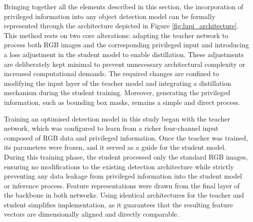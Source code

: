 Bringing together all the elements described in this section, the incorporation of privileged information into any object detection model can be formally represented through the architecture depicted in Figure \ref{fig:lupi_architecture}. This method rests on two core alterations: adapting the teacher network to process both RGB images and the corresponding privileged input and introducing a loss adjustment in the student model to enable distillation. These adjustments are deliberately kept minimal to prevent unnecessary architectural complexity or increased computational demands. The required changes are confined to modifying the input layer of the teacher model and integrating a distillation mechanism during the student training. Moreover, generating the privileged information, such as bounding box masks, remains a simple and direct process.

Training an optimised detection model in this study began with the teacher network, which was configured to learn from a richer four-channel input composed of RGB data and privileged information. Once the teacher was trained, its parameters were frozen, and it served as a guide for the student model. During this training phase, the student processed only the standard RGB images, ensuring no modifications to the existing detection architecture while strictly preventing any data leakage from privileged information into the student model or inference process. Feature representations were drawn from the final layer of the backbone in both networks. Using identical architectures for the teacher and student simplifies implementation, as it guarantees that the resulting feature vectors are dimensionally aligned and directly comparable.



